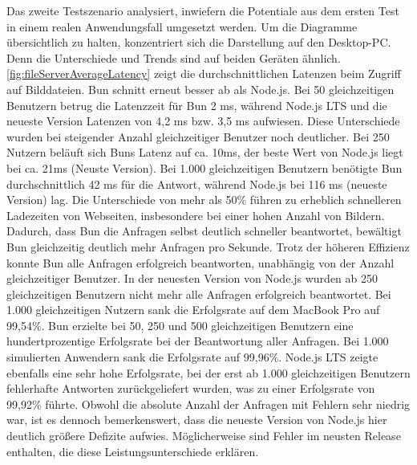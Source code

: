 \noindent
Das zweite Testszenario analysiert, inwiefern die Potentiale aus dem ersten Test in einem realen Anwendungsfall umgesetzt werden. Um die Diagramme übersichtlich zu halten, konzentriert sich die Darstellung auf den Desktop-PC. Denn die Unterschiede und Trends sind auf beiden Geräten ähnlich. \autoref{fig:fileServerAverageLatency} zeigt die durchschnittlichen Latenzen beim Zugriff auf Bilddateien. Bun schnitt erneut besser ab als Node.js. Bei 50 gleichzeitigen Benutzern betrug die Latenzzeit für Bun 2 ms, während Node.js LTS und die neueste Version Latenzen von 4,2 ms bzw. 3,5 ms aufwiesen. Diese Unterschiede wurden bei steigender Anzahl gleichzeitiger Benutzer noch deutlicher. Bei 250 Nutzern beläuft sich Buns Latenz auf ca. 10ms, der beste Wert von Node.js liegt bei ca. 21ms (Neuste Version). Bei 1.000 gleichzeitigen Benutzern benötigte Bun durchschnittlich 42 ms für die Antwort, während Node.js bei 116 ms (neueste Version) lag. Die Unterschiede von mehr als 50\% führen zu erheblich schnelleren Ladezeiten von Webseiten, insbesondere bei einer hohen Anzahl von Bildern. Dadurch, dass Bun die Anfragen selbst deutlich schneller beantwortet, bewältigt Bun gleichzeitig deutlich mehr Anfragen pro Sekunde. Trotz der höheren Effizienz konnte Bun alle Anfragen erfolgreich beantworten, unabhängig von der Anzahl gleichzeitiger Benutzer. In der neuesten Version von Node.js wurden ab 250 gleichzeitigen Benutzern nicht mehr alle Anfragen erfolgreich beantwortet. Bei 1.000 gleichzeitigen Nutzern sank die Erfolgsrate auf dem MacBook Pro auf 99,54\%. Bun erzielte bei 50, 250 und 500 gleichzeitigen Benutzern eine hundertprozentige Erfolgsrate bei der Beantwortung aller Anfragen. Bei 1.000 simulierten Anwendern sank die Erfolgsrate auf 99,96\%. Node.js LTS zeigte ebenfalls eine sehr hohe Erfolgsrate, bei der erst ab 1.000 gleichzeitigen Benutzern fehlerhafte Antworten zurückgeliefert wurden, was zu einer Erfolgsrate von 99,92\% führte. Obwohl die absolute Anzahl der Anfragen mit Fehlern sehr niedrig war, ist es dennoch bemerkenswert, dass die neueste Version von Node.js hier deutlich größere Defizite aufwies. Möglicherweise sind Fehler im neusten Release enthalten, die diese Leistungsunterschiede erklären.\\

